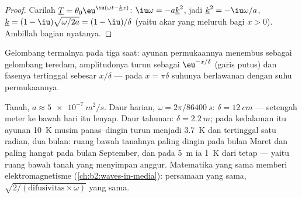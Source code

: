 \begin{proof}
Carilah $\underline T = \theta_0\eu^{\iu(\omega t - \underline k x)}$:
$\iu\omega = -a\underline k^2$, jadi $\underline k^2 = -\iu\omega/a$,
$\underline k = (1 - \iu)\sqrt{\omega/2a} = (1 - \iu)/\delta$ (yaitu akar
yang meluruh bagi $x > 0$). Ambillah bagian nyatanya.
\end{proof}

\begin{omfigure}

{\small Gelombang termalnya pada tiga saat: ayunan permukaannya
menembus sebagai gelombang teredam, amplitudonya turun sebagai $\eu^{-x/\delta}$
(garis putus) dan fasenya tertinggal sebesar $x/\delta$ --- pada $x = \pi\delta$
suhunya berlawanan dengan suhu permukaannya.}
\end{omfigure}

\begin{example}\label{ex:b2:heat-conduction:soil}
Tanah, $a \approx \qty{5e-7}{m^2/s}$. Daur harian, $\omega = 2\pi/\qty{86400}{s}$:
$\delta = \qty{12}{cm}$ --- setengah meter ke bawah hari itu lenyap. Daur tahunan:
$\delta = \qty{2.2}{m}$; pada kedalaman itu ayunan \qty{10}{K} musim panas--dingin
turun menjadi \qty{3.7}{K} dan tertinggal satu radian, dua bulan: ruang bawah tanahnya
paling dingin pada bulan Maret dan paling hangat pada bulan September, dan pada \qty{5}{m} ia
\qty{1}{K} dari tetap --- yaitu ruang bawah tanah yang menyimpan anggur. Matematika
yang sama memberi  elektromagnetisme
(\cref{ch:b2:waves-in-media}): persamaan yang sama, $\sqrt{2/(\text{difusivitas}
\times\omega)}$ yang sama.
\end{example}

